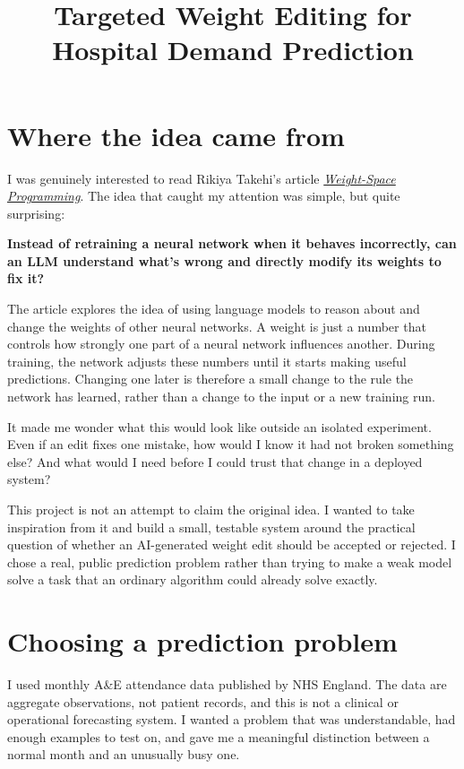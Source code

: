 \documentclass[11pt,a4paper]{article}
\title{\vspace{-1cm}Targeted Weight Editing for Hospital Demand Prediction}
\author{}
\date{}
\begin{document}
\maketitle
\vspace{-1.7em}

\section*{Where the idea came from}
I was genuinely interested to read Rikiya Takehi's article \href{https://rikiyat.github.io/blog/weight-space-programming/}{\emph{Weight-Space Programming}}. The idea that caught my attention was simple, but quite surprising:

\textbf{Instead of retraining a neural network when it behaves incorrectly, can an LLM understand what's wrong and directly modify its weights to fix it?}

The article explores the idea of using language models to reason about and change the weights of other neural networks. A weight is just a number that controls how strongly one part of a neural network influences another. During training, the network adjusts these numbers until it starts making useful predictions. Changing one later is therefore a small change to the rule the network has learned, rather than a change to the input or a new training run.

It made me wonder what this would look like outside an isolated experiment. Even if an edit fixes one mistake, how would I know it had not broken something else? And what would I need before I could trust that change in a deployed system?

This project is not an attempt to claim the original idea. I wanted to take inspiration from it and build a small, testable system around the practical question of whether an AI-generated weight edit should be accepted or rejected. I chose a real, public prediction problem rather than trying to make a weak model solve a task that an ordinary algorithm could already solve exactly.

\section*{Choosing a prediction problem}
I used monthly A\&E attendance data published by NHS England. The data are aggregate observations, not patient records, and this is not a clinical or operational forecasting system. I wanted a problem that was understandable, had enough examples to test on, and gave me a meaningful distinction between a normal month and an unusually busy one.
\end{document}
